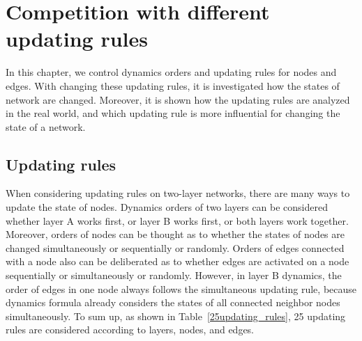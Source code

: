 
\chapter{Competition with different updating rules}
\label{chap4}
In this chapter, we control dynamics orders and updating rules for nodes and edges. With changing these updating rules, it is investigated how the states of network are changed. Moreover, it is shown how the updating rules are analyzed in the real world, and which updating rule is more influential for changing the state of a network.\\

\section{Updating rules}

When considering updating rules on two-layer networks, there are many ways to update the state of nodes. Dynamics orders of two layers can be considered whether layer A works first, or layer B works first, or both layers work together. Moreover, orders of nodes can be thought as to whether the states of nodes are changed simultaneously or sequentially or randomly. Orders of edges connected with a node also can be deliberated as to whether edges are activated on a node sequentially or simultaneously or randomly. However, in layer B dynamics, the order of edges in one node always follows the simultaneous updating rule, because dynamics formula already considers the states of all connected neighbor nodes simultaneously. To sum up, as shown in Table~\ref{25updating_rules}, 25 updating rules are considered according to layers, nodes, and edges.


